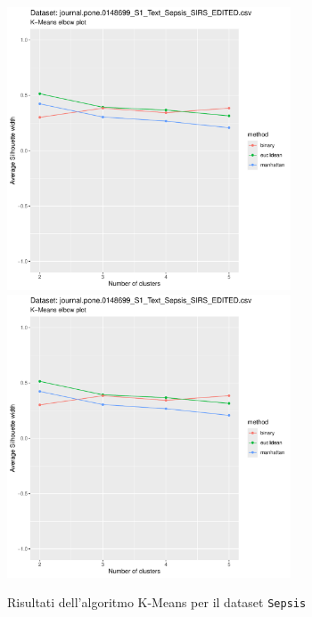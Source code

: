\documentclass[a4paper, 12pt]{report}
\begin{document}
			\begin{figure}[H]
				\centering
				\includegraphics[width = 0.75\textwidth, height = 0.45\textheight, page = 1]{
					results/results_Sepsis.csv.pdf
				}
				\includegraphics[width = 0.75\textwidth, height = 0.45\textheight, page = 2]{
					results/results_Sepsis.csv.pdf
				}
				\caption{Risultati dell'algoritmo K-Means per il dataset
				\texttt{Sepsis}}
				\label{fig:kmeans5}
			\end{figure}
\end{document}

